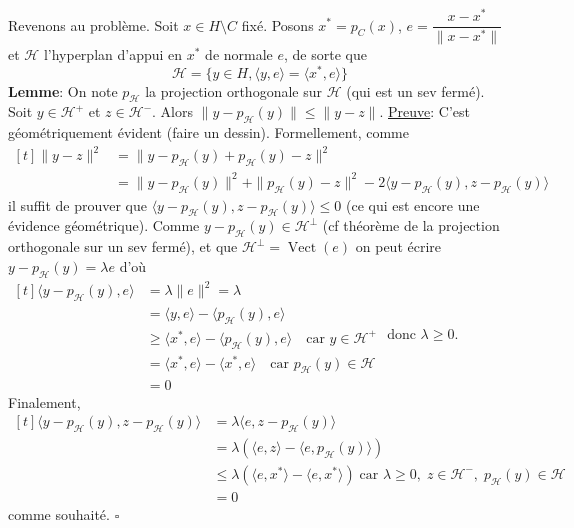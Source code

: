 \documentclass{fancybook}
\begin{document}
Revenons au problème. Soit $x\in H\setminus C$ fixé. Posons $x^*=p_C(x)$, $e=\dfrac{x-x^*}{\|x-x^*\|}$ et $\mathcal H$ l'hyperplan d'appui en $x^*$ de normale $e$, de sorte que $$\mathcal H=\{y\in H, \langle y,e\rangle = \langle x^*,e\rangle\}$$
\textbf{Lemme}: On note $p_{\mathcal H}$ la projection orthogonale sur $\mathcal H$ (qui est un sev fermé). Soit $y\in \mathcal H^+$ et $z\in \mathcal H^-$. Alors $\|y-p_{\mathcal H}(y)\|\leq \|y-z\|$.  \newline \newline
\underline{Preuve}: C'est géométriquement évident (faire un dessin). Formellement, comme 
$\begin{aligned}[t]\|y-z\|^2&=\|y-p_{\mathcal H}(y) + p_{\mathcal H}(y)-z\|^2 \\
&= \|y-p_{\mathcal H}(y)\|^2 + \|p_{\mathcal H}(y)-z\|^2 -2\langle y-p_{\mathcal H}(y), z-p_{\mathcal H}(y)\rangle
\end{aligned}$\newline
il suffit de prouver que $\langle y-p_{\mathcal H}(y), z-p_{\mathcal H}(y)\rangle \leq 0$ (ce qui est encore une évidence géométrique).\newline
Comme $y-p_{\mathcal H}(y)\in \mathcal H^\bot$ (cf théorème de la projection orthogonale sur un sev fermé), et que $\mathcal H^{\bot}=\operatorname{Vect}(e)$ on peut écrire \newline
$y-p_{\mathcal H}(y) = \lambda e$ d'où $\begin{aligned}[t]\langle y-p_{\mathcal H}(y), e\rangle &= \lambda \|e\|^2=\lambda\\ 
&= \langle y, e\rangle - \langle p_{\mathcal H}(y), e\rangle \\
&\geq \langle x^*, e\rangle - \langle p_{\mathcal H}(y), e\rangle \quad \text{car }y\in \mathcal H^+ \\
&= \langle x^*, e\rangle - \langle x^*, e\rangle \quad \text{car }p_{\mathcal H}(y)\in \mathcal H \\
&= 0 \end{aligned} $\newline 
donc $\lambda \geq 0$.\newline
Finalement, $\begin{aligned}[t] \langle y-p_{\mathcal H}(y), z-p_{\mathcal H}(y)\rangle &= \lambda \langle e, z-p_{\mathcal H}(y) \rangle \\
&= \lambda \left( \langle e, z\rangle - \langle e, p_{\mathcal H}(y) \rangle \right)\\
&\leq \lambda \left( \langle e, x^*\rangle - \langle e, x^* \rangle \right) \; \text{car } \lambda\geq 0,\; z\in \mathcal H^-, \;p_{\mathcal H}(y)\in \mathcal H \\
&= 0
\end{aligned}$\newline
comme souhaité. \null \hfill $\square$\\
\end{document}
